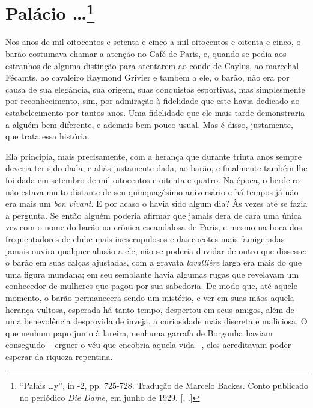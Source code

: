\chapter{Palácio \ldots{}\footnote[*]{``Palais \ldots{}y'', in  -2, pp.
  725-728. Tradução de Marcelo Backes. Conto publicado no periódico
  \emph{Die Dame}, em junho de 1929. [. .]} }

Nos anos de mil oitocentos e setenta e cinco a mil oitocentos e oitenta
e cinco, o barão  costumava chamar a atenção no Café de Paris, e,
quando se pedia aos estranhos de alguma distinção para atentarem ao
conde de Caylus, ao marechal Fécamts, ao cavaleiro Raymond Grivier e
também a ele, o barão, não era por causa de sua elegância, sua origem,
suas conquistas esportivas, mas simplesmente por reconhecimento, sim,
por admiração à fidelidade que este havia dedicado ao estabelecimento
por tantos anos. Uma fidelidade que ele mais tarde demonstraria a alguém
bem diferente, e ademais bem pouco usual. Mas é disso, justamente, que
trata essa história.

Ela principia, mais precisamente, com a herança que durante trinta anos
sempre deveria ter sido dada, e aliás justamente dada, ao barão, e
finalmente também lhe foi dada em setembro de mil oitocentos e oitenta e
quatro. Na época, o herdeiro não estava muito distante de seu
quinquagésimo aniversário e há tempos já não era mais um \emph{bon}
\emph{vivant}. E por acaso o havia sido algum dia? Às vezes até se fazia
a pergunta. Se então alguém poderia afirmar que jamais dera de cara uma
única vez com o nome do barão na crônica escandalosa de Paris, e mesmo
na boca dos frequentadores de clube mais inescrupulosos e das cocotes
mais famigeradas jamais ouvira qualquer alusão a ele, não se poderia
duvidar de outro que dissesse: o barão em suas calças ajustadas, com a
gravata \emph{lavallière} larga era mais do que uma figura mundana; em
seu semblante havia algumas rugas que revelavam um conhecedor de
mulheres que pagou por sua sabedoria. De modo que, até aquele momento, o
barão permanecera sendo um mistério, e ver em suas mãos aquela herança
vultosa, esperada há tanto tempo, despertou em seus amigos, além de uma
benevolência desprovida de inveja, a curiosidade mais discreta e
maliciosa. O que nenhum papo junto à lareira, nenhuma garrafa de
Borgonha haviam conseguido -- erguer o véu que encobria aquela vida --,
eles acreditavam poder esperar da riqueza repentina.

